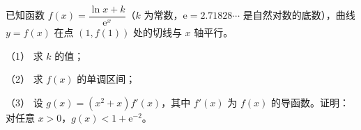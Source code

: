 \begin{question}
已知函数 $f(x)=\dfrac{\ln x+k}{\mathrm e^x}$（$k$ 为常数，$\mathrm e=2.71828\cdots$ 是自然对数的底数），曲线 $y=f(x)$ 在点 $(1,f(1))$ 处的切线与 $x$ 轴平行。

（1） 求 $k$ 的值；

（2） 求 $f(x)$ 的单调区间；

（3） 设 $g(x)=(x^2+x)f'(x)$，其中 $f'(x)$ 为 $f(x)$ 的导函数。证明：对任意 $x>0$，$g(x)<1+\mathrm e^{-2}$。

\end{question}